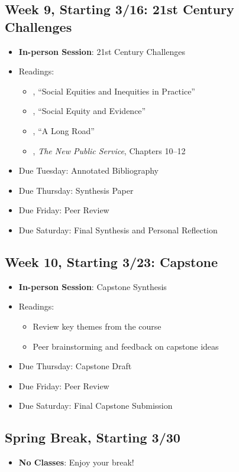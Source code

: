 \documentclass[11pt, letterpaper]{article}
\begin{document}
\subsection*{Week 9, Starting 3/16: 21st Century Challenges}
\begin{itemize}
    \item \textbf{In-person Session}: 21st Century Challenges
    \item Readings:
        \begin{itemize}
            \item \citet{maynard-moody2012}, ``Social Equities and Inequities in Practice'' 
            \item \citet{GOODEN2017}, ``Social Equity and Evidence'' 
            \item \citet{mccandless2022}, ``A Long Road''
            \item \citet{Denhardt2015}, \emph{The New Public Service}, Chapters 10--12 
        \end{itemize}
    \item Due Tuesday: Annotated Bibliography
    \item Due Thursday: Synthesis Paper
    \item Due Friday: Peer Review
    \item Due Saturday: Final Synthesis and Personal Reflection
\end{itemize}

\subsection*{Week 10, Starting 3/23: Capstone}
\begin{itemize}
    \item \textbf{In-person Session}: Capstone Synthesis
    \item Readings:
        \begin{itemize}
            \item Review key themes from the course
            \item Peer brainstorming and feedback on capstone ideas
        \end{itemize}
    \item Due Thursday: Capstone Draft
    \item Due Friday: Peer Review
    \item Due Saturday: Final Capstone Submission
\end{itemize}

\subsection*{Spring Break, Starting 3/30}
\begin{itemize}
    \item \textbf{No Classes}: Enjoy your break!
\end{itemize}
\end{document}
